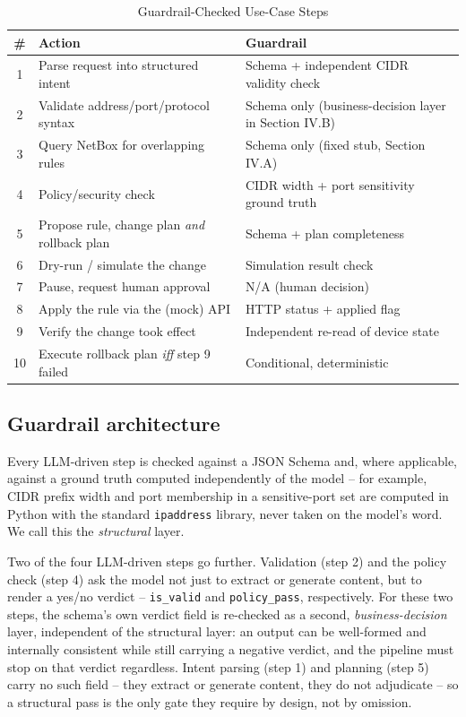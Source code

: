 \documentclass[conference]{IEEEtran}
\begin{document}
\begin{table}[!t]
\caption{Guardrail-Checked Use-Case Steps}
\label{tab:usecase}
\centering
\footnotesize
\begin{tabularx}{\columnwidth}{@{}c X X@{}}
\hline
\textbf{\#} & \textbf{Action} & \textbf{Guardrail} \\
\hline
1  & Parse request into structured intent & Schema + independent CIDR validity check \\
2  & Validate address/port/protocol syntax & Schema only (business-decision layer in Section IV.B) \\
3  & Query NetBox for overlapping rules & Schema only (fixed stub, Section IV.A) \\
4  & Policy/security check & CIDR width + port sensitivity ground truth \\
5  & Propose rule, change plan \emph{and} rollback plan & Schema + plan completeness \\
6  & Dry-run / simulate the change & Simulation result check \\
7  & Pause, request human approval & N/A (human decision) \\
8  & Apply the rule via the (mock) API & HTTP status + applied flag \\
9  & Verify the change took effect & Independent re-read of device state \\
10 & Execute rollback plan \emph{iff} step 9 failed & Conditional, deterministic \\
\hline
\end{tabularx}
\end{table}

\subsection{Guardrail architecture}
Every LLM-driven step is checked against a JSON Schema and, where applicable, against a ground truth computed independently of the model -- for example, CIDR prefix width and port membership in a sensitive-port set are computed in Python with the standard \texttt{ipaddress} library, never taken on the model's word. We call this the \emph{structural} layer.

Two of the four LLM-driven steps go further. Validation (step 2) and the policy check (step 4) ask the model not just to extract or generate content, but to render a yes/no verdict -- \texttt{is\_valid} and \texttt{policy\_pass}, respectively. For these two steps, the schema's own verdict field is re-checked as a second, \emph{business-decision} layer, independent of the structural layer: an output can be well-formed and internally consistent while still carrying a negative verdict, and the pipeline must stop on that verdict regardless. Intent parsing (step 1) and planning (step 5) carry no such field -- they extract or generate content, they do not adjudicate -- so a structural pass is the only gate they require by design, not by omission.
\end{document}
